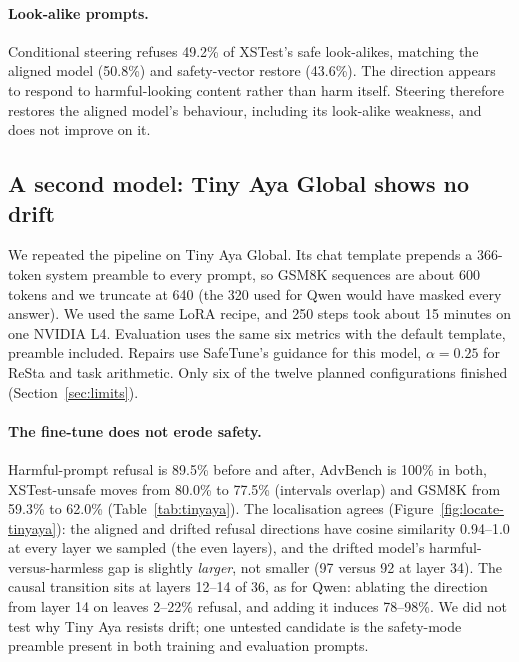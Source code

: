 \paragraph{Look-alike prompts.} Conditional steering refuses 49.2\% of XSTest's safe look-alikes, matching the aligned model (50.8\%) and safety-vector restore (43.6\%). The direction appears to respond to harmful-looking content rather than harm itself. Steering therefore restores the aligned model's behaviour, including its look-alike weakness, and does not improve on it.

\subsection{A second model: Tiny Aya Global shows no drift}\label{sec:tinyaya}
We repeated the pipeline on Tiny Aya Global. Its chat template prepends a 366-token system preamble to every prompt, so GSM8K sequences are about 600 tokens and we truncate at 640 (the 320 used for Qwen would have masked every answer). We used the same LoRA recipe, and 250 steps took about 15 minutes on one NVIDIA L4. Evaluation uses the same six metrics with the default template, preamble included. Repairs use SafeTune's guidance for this model, $\alpha{=}0.25$ for ReSta and task arithmetic. Only six of the twelve planned configurations finished (Section~\ref{sec:limits}).

\begin{table}[t]
\centering
\caption{Tiny Aya Global: refusal rates and GSM8K accuracy (\%) with 95\% Wilson intervals; same metrics and sample sizes as Table~\ref{tab:main}. Only six of twelve planned configurations finished.}
\label{tab:tinyaya}
\footnotesize
\setlength{\tabcolsep}{4pt}

\end{table}

\paragraph{The fine-tune does not erode safety.} Harmful-prompt refusal is 89.5\% before and after, AdvBench is 100\% in both, XSTest-unsafe moves from 80.0\% to 77.5\% (intervals overlap) and GSM8K from 59.3\% to 62.0\% (Table~\ref{tab:tinyaya}). The localisation agrees (Figure~\ref{fig:locate-tinyaya}): the aligned and drifted refusal directions have cosine similarity 0.94--1.0 at every layer we sampled (the even layers), and the drifted model's harmful-versus-harmless gap is slightly \emph{larger}, not smaller (97 versus 92 at layer 34). The causal transition sits at layers 12--14 of 36, as for Qwen: ablating the direction from layer 14 on leaves 2--22\% refusal, and adding it induces 78--98\%. We did not test why Tiny Aya resists drift; one untested candidate is the safety-mode preamble present in both training and evaluation prompts.

